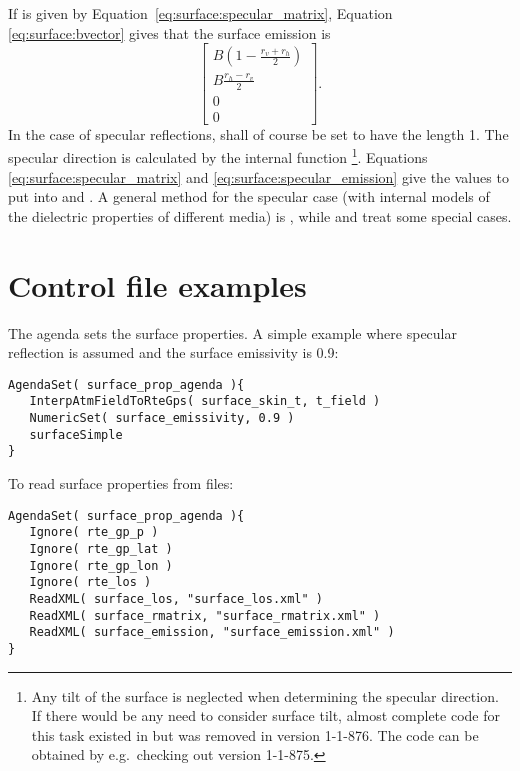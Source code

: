 If  is given by Equation~\ref{eq:surface:specular_matrix},
Equation \ref{eq:surface:bvector} gives that the surface emission  is
\begin{equation}
  \label{eq:surface:specular_emission}
   \left[\begin{array}{c}
     B\left(1-\frac{r_v+r_h}{2}\right) \\
     B\frac{r_h-r_v}{2} \\
     0\\0
   \end{array}\right].
\end{equation}
In the case of specular reflections,  shall of
course be set to have the length 1. The specular direction is
calculated by the internal function
\footnote{Any tilt of the surface is
  neglected when determining the specular direction. If there would be
  any need to consider surface tilt, almost complete code for this
  task existed in  but was removed
  in version 1-1-876. The code can be obtained by e.g.\ checking out
  version 1-1-875.}.  Equations \ref{eq:surface:specular_matrix} and
\ref{eq:surface:specular_emission} give the values to put into
 and . A
general method for the specular case (with internal models of the
dielectric properties of different media) is ,
while  and
 treat some special cases.



\section{Control file examples}
\label{sec:surface:cfile}

The agenda  sets the surface properties.
A simple example where specular reflection is assumed and the surface 
emissivity is 0.9:
\begin{verbatim}
AgendaSet( surface_prop_agenda ){
   InterpAtmFieldToRteGps( surface_skin_t, t_field )
   NumericSet( surface_emissivity, 0.9 )
   surfaceSimple
}

\end{verbatim}
To read surface properties from files:
\begin{verbatim}
AgendaSet( surface_prop_agenda ){
   Ignore( rte_gp_p )
   Ignore( rte_gp_lat )
   Ignore( rte_gp_lon )
   Ignore( rte_los )
   ReadXML( surface_los, "surface_los.xml" )
   ReadXML( surface_rmatrix, "surface_rmatrix.xml" )
   ReadXML( surface_emission, "surface_emission.xml" )
}
\end{verbatim}



 




